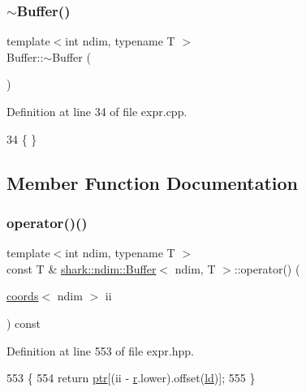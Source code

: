 \subsubsection{\texorpdfstring{$\sim$\+Buffer()}{~Buffer()}}
{\footnotesize\ttfamily template$<$int ndim, typename T $>$ \\
Buffer\+::$\sim$\+Buffer (\begin{DoxyParamCaption}{ }\end{DoxyParamCaption})}



Definition at line 34 of file expr.\+cpp.


\begin{DoxyCode}
34 \{ \}
\end{DoxyCode}


\subsection{Member Function Documentation}
\hypertarget{classshark_1_1ndim_1_1_buffer_ad2395794d4c56e71376178d770061a09}{}\label{classshark_1_1ndim_1_1_buffer_ad2395794d4c56e71376178d770061a09} 
\subsubsection{\texorpdfstring{operator()()}{operator()()}}
{\footnotesize\ttfamily template$<$int ndim, typename T $>$ \\
const T \& \hyperlink{classshark_1_1ndim_1_1_buffer}{shark\+::ndim\+::\+Buffer}$<$ ndim, T $>$\+::operator() (\begin{DoxyParamCaption}\item[{\hyperlink{structshark_1_1ndim_1_1coords}{coords}$<$ ndim $>$}]{ii }\end{DoxyParamCaption}) const\hspace{0.3cm}{\ttfamily [inline]}}



Definition at line 553 of file expr.\+hpp.


\begin{DoxyCode}
553                                                                         \{
554             \textcolor{keywordflow}{return} \hyperlink{classshark_1_1ndim_1_1_buffer_a0a63bf45d2f93a9670d736ae5123331a}{ptr}[(ii - \hyperlink{classshark_1_1ndim_1_1_buffer_adf5e1304ce98553284cf98e88e6c24e0}{r}.lower).offset(\hyperlink{classshark_1_1ndim_1_1_buffer_aa17fcbd807223fcb3cc5f211c32253d1}{ld})];
555         \}
\end{DoxyCode}


